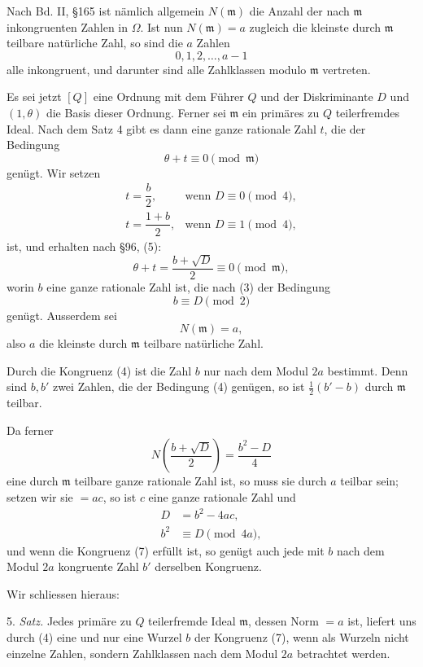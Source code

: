 \documentclass[11pt]{article}
\begin{document}
Nach Bd. II, \S 165 ist nämlich allgemein $N(\mathfrak m)$ die Anzahl der nach $\mathfrak m$ inkongruenten Zahlen in $\Omega$. Ist nun $N(\mathfrak m)=a$ zugleich die kleinste durch $\mathfrak m$ teilbare natürliche Zahl, so sind die $a$ Zahlen
\[
 0,1,2,\ldots,a-1
\]
alle inkongruent, und darunter sind alle Zahlklassen modulo $\mathfrak m$ vertreten.

Es sei jetzt $[Q]$ eine Ordnung mit dem Führer $Q$ und der Diskriminante $D$ und $(1,\theta)$ die Basis dieser Ordnung. Ferner sei $\mathfrak m$ ein primäres zu $Q$ teilerfremdes Ideal. Nach dem Satz 4 gibt es dann eine ganze rationale Zahl $t$, die der Bedingung
\[
 \theta+t\equiv0\pmod{\mathfrak m}
\]
genügt. Wir setzen
\begin{equation}
\begin{array}{ll}
 t=\dfrac{b}{2}, & \text{wenn }D\equiv0\pmod4,\\[0.8em]
 t=\dfrac{1+b}{2}, & \text{wenn }D\equiv1\pmod4,
\end{array}
\tag{3}
\end{equation}
ist, und erhalten nach \S 96, (5):
\begin{equation}
 \theta+t=\frac{b+\sqrt D}{2}\equiv0\pmod{\mathfrak m},
\tag{4}
\end{equation}
worin $b$ eine ganze rationale Zahl ist, die nach (3) der Bedingung
\[
 b\equiv D\pmod2
\]
genügt. Ausserdem sei
\begin{equation}
 N(\mathfrak m)=a,
\tag{5}
\end{equation}
also $a$ die kleinste durch $\mathfrak m$ teilbare natürliche Zahl.

Durch die Kongruenz (4) ist die Zahl $b$ nur nach dem Modul $2a$ bestimmt. Denn sind $b,b'$ zwei Zahlen, die der Bedingung (4) genügen, so ist $\frac12(b'-b)$ durch $\mathfrak m$ teilbar.

Da ferner
\[
 N\left(\frac{b+\sqrt D}{2}\right)=\frac{b^2-D}{4}
\]
eine durch $\mathfrak m$ teilbare ganze rationale Zahl ist, so muss sie durch $a$ teilbar sein; setzen wir sie $=ac$, so ist $c$ eine ganze rationale Zahl und
\begin{align}
 D&=b^2-4ac,
\tag{6}\\
 b^2&\equiv D\pmod{4a},
\tag{7}
\end{align}
und wenn die Kongruenz (7) erfüllt ist, so genügt auch jede mit $b$ nach dem Modul $2a$ kongruente Zahl $b'$ derselben Kongruenz.

Wir schliessen hieraus:

5. \emph{Satz.} Jedes primäre zu $Q$ teilerfremde Ideal $\mathfrak m$, dessen Norm $=a$ ist, liefert uns durch (4) eine und nur eine Wurzel $b$ der Kongruenz (7), wenn als Wurzeln nicht einzelne Zahlen, sondern Zahlklassen nach dem Modul $2a$ betrachtet werden.
\end{document}
